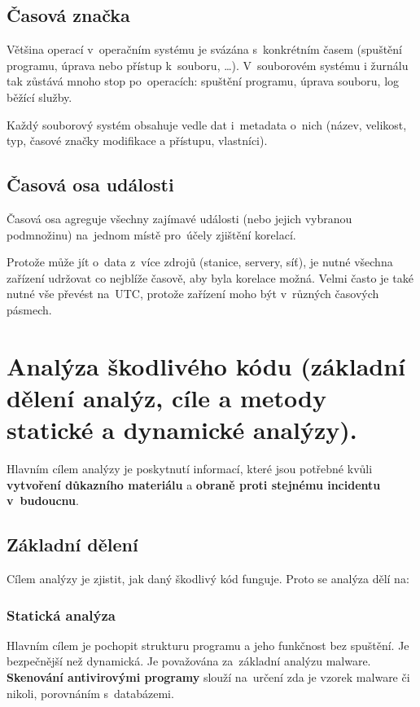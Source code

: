 \subsection{Časová značka}

Většina operací v~operačním systému je svázána s~konkrétním časem (spuštění programu, úprava nebo přístup k~souboru, \dots).
V~souborovém systému i žurnálu tak zůstává mnoho stop po~operacích: spuštění programu, úprava souboru, log běžící služby.

Každý souborový systém obsahuje vedle dat i~metadata o~nich (název, velikost, typ, časové značky modifikace a přístupu, vlastníci).


\subsection{Časová osa události}

Časová osa agreguje všechny zajímavé události (nebo jejich vybranou podmnožinu) na~jednom místě pro~účely zjištění korelací.

Protože může jít o~data z~více zdrojů (stanice, servery, síť), je nutné všechna zařízení udržovat co nejblíže časově, aby byla korelace možná.
Velmi často je také nutné vše převést na~UTC, protože zařízení moho být v~různých časových pásmech.


\clearpage
\section{Analýza škodlivého kódu (základní dělení analýz, cíle a metody statické a dynamické analýzy).}

Hlavním cílem analýzy je poskytnutí informací, které jsou potřebné kvůli \textbf{vytvoření důkazního materiálu} a \textbf{obraně proti stejnému incidentu v~budoucnu}.  

\subsection{Základní dělení}

Cílem analýzy je zjistit, jak daný škodlivý kód funguje. Proto se analýza dělí na:

\subsubsection{Statická analýza}

Hlavním cílem je pochopit strukturu programu a jeho funkčnost bez spuštění.
Je bezpečnější než dynamická.
Je považována za~základní analýzu malware.
\textbf{Skenování antivirovými programy} slouží na~určení zda je vzorek malware či nikoli, porovnáním s~databázemi.

